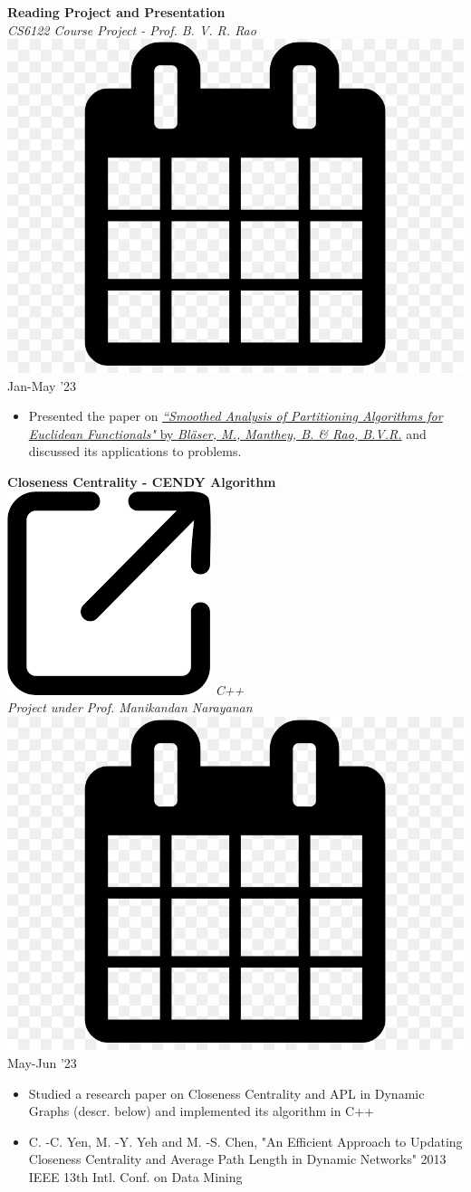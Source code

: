 \documentclass[10pt,article]{article}
\newcommand{\myMargin}{0.2in}
\newcommand{\myfont}[2]{\fontsize{#1}{#1}\selectfont #2}
\newcommand{\projecttopic}[1]{\myfont{11pt}{\textbf{#1}}}
\newcommand{\projectdesc}[1]{\myfont{10pt}{\textcolor{projDescColor}{\textit{#1}}}}
\newcommand{\mylink}[1]{\href{#1}{\includegraphics[scale=0.03]{download.png}}}
\newcommand{\mycal}[1]{\includegraphics[scale=0.02]{calendar.png} \myfont{10}{#1}}
\begin{document}
\begin{multicols*}{2}
\noindent
\hrulefill


\noindent
\projecttopic{Reading Project and Presentation} \\
\projectdesc{CS6122 Course Project - Prof. B. V. R. Rao} \hfill \mycal{Jan-May '23} 
\begin{itemize}[noitemsep, nolistsep, leftmargin=\myMargin]
    \item Presented the paper on \href{https://doi.org/10.1007/s00453-012-9643-5}{\textit{``Smoothed Analysis of Partitioning Algorithms for Euclidean Functionals"} 
    by \textit{Bläser, M., Manthey, B. \& Rao, B.V.R.}} and discussed its applications to problems.
\end{itemize}

\noindent
\hrulefill


\noindent
\projecttopic{Closeness Centrality - CENDY Algorithm} \mylink{https://github.com/Snehadeep-Gayen/CENDY-Incremental-CC}
 \hfill \textcolor{projDescColor}{\textit{C++}} \\
\projectdesc{Project under Prof. Manikandan Narayanan} \hfill \mycal{May-Jun '23}
\begin{itemize}[noitemsep, nolistsep, leftmargin=\myMargin]
    \item Studied a research paper on Closeness Centrality and APL in Dynamic Graphs (descr. below) and implemented its algorithm in C++
    \item C. -C. Yen, M. -Y. Yeh and M. -S. Chen, "An Efficient Approach to Updating Closeness Centrality and Average Path Length in Dynamic Networks" 2013 IEEE 13th Intl. Conf. on Data Mining
 \end{itemize}




 
 

\end{multicols*}
\end{document}
